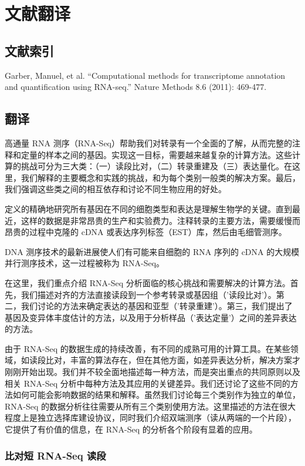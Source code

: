\chapter{文献翻译}

\section{文献索引}
Garber, Manuel, et al. ``Computational methods for transcriptome annotation and quantification using RNA-seq.'' Nature Methods 8.6 (2011): 469-477.

\section{翻译}
高通量 RNA 测序（RNA-Seq）帮助我们对转录有一个全面的了解，从而完整的注释和定量的样本之间的基因。实现这一目标，需要越来越复杂的计算方法。这些计算的挑战可分为三大类：（一）读段比对，（二）转录重建及（三）表达量化。在这里，我们解释的主要概念和实践的挑战，和为每个类别一般类的解决方案。最后，我们强调这些类之间的相互依存和讨论不同生物应用的好处。

定义的精确地研究所有基因在不同的细胞类型和表达是理解生物学的关键。直到最近，这样的数据是非常昂贵的生产和实验费力。注释转录的主要方法，需要缓慢而昂贵的过程中克隆的 cDNA 或表达序列标签（EST）库，然后由毛细管测序。

DNA 测序技术的最新进展使人们有可能来自细胞的 RNA 序列的 cDNA 的大规模并行测序技术，这一过程被称为 RNA-Seq。

在这里，我们重点介绍 RNA-Seq 分析面临的核心挑战和需要解决的计算方法。首先，我们描述对齐的方法直接读段到一个参考转录或基因组（'读段比对'）。第二，我们讨论的方法来确定表达的基因和亚型（'转录重建'）。第三，我们提出了基因及变异体丰度估计的方法，以及用于分析样品（'表达定量'）之间的差异表达的方法。

由于 RNA-Seq 的数据生成的持续改善，有不同的成熟可用的计算工具。在某些领域，如读段比对，丰富的算法存在，但在其他方面，如差异表达分析，解决方案才刚刚开始出现。我们并不较全面地描述每一种方法，而是突出重点的共同原则以及相关 RNA-Seq 分析中每种方法及其应用的关键差异。我们还讨论了这些不同的方法如何可能会影响数据的结果和解释。虽然我们讨论每三个类别作为独立的单位，RNA-Seq 的数据分析往往需要从所有三个类别使用方法。这里描述的方法在很大程度上是独立选择库建设协议，同时我们介绍双端测序（读从两端的一个片段），它提供了有价值的信息，在 RNA-Seq 的分析各个阶段有显着的应用。

\subsection{比对短 RNA-Seq 读段}

